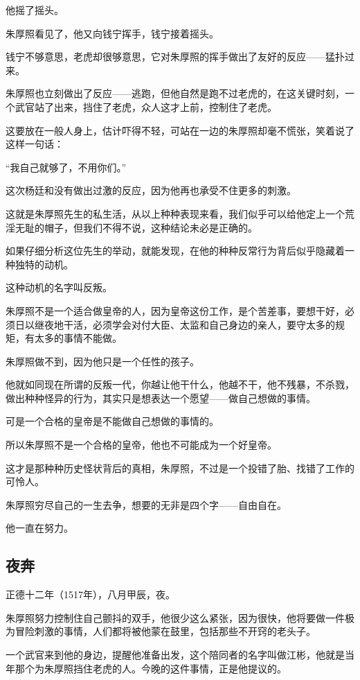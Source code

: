 \begin{multicols}{\theparacolNo}
		他摇了摇头。

		朱厚照看见了，他又向钱宁挥手，钱宁接着摇头。

		钱宁不够意思，老虎却很够意思，它对朱厚照的挥手做出了友好的反应——猛扑过来。

		朱厚照也立刻做出了反应——逃跑，但他自然是跑不过老虎的，在这关键时刻，一个武官站了出来，挡住了老虎，众人这才上前，控制住了老虎。

		这要放在一般人身上，估计吓得不轻，可站在一边的朱厚照却毫不慌张，笑着说了这样一句话：

		“我自己就够了，不用你们。”

		这次杨廷和没有做出过激的反应，因为他再也承受不住更多的刺激。

		这就是朱厚照先生的私生活，从以上种种表现来看，我们似乎可以给他定上一个荒淫无耻的帽子，但我们不得不说，这种结论未必是正确的。

		如果仔细分析这位先生的举动，就能发现，在他的种种反常行为背后似乎隐藏着一种独特的动机。

		这种动机的名字叫反叛。

		朱厚照不是一个适合做皇帝的人，因为皇帝这份工作，是个苦差事，要想干好，必须日以继夜地干活，必须学会对付大臣、太监和自己身边的亲人，要守太多的规矩，有太多的事情不能做。

		朱厚照做不到，因为他只是一个任性的孩子。

		他就如同现在所谓的反叛一代，你越让他干什么，他越不干，他不残暴，不杀戮，做出种种怪异的行为，其实只是想表达一个愿望——做自己想做的事情。

		可是一个合格的皇帝是不能做自己想做的事情的。

		所以朱厚照不是一个合格的皇帝，他也不可能成为一个好皇帝。

		这才是那种种历史怪状背后的真相，朱厚照，不过是一个投错了胎、找错了工作的可怜人。

		朱厚照穷尽自己的一生去争，想要的无非是四个字——自由自在。

		他一直在努力。

		\subsection{夜奔}
		正德十二年（1517年），八月甲辰，夜。

		朱厚照努力控制住自己颤抖的双手，他很少这么紧张，因为很快，他将要做一件极为冒险刺激的事情，人们都将被他蒙在鼓里，包括那些不开窍的老头子。

		一个武官来到他的身边，提醒他准备出发，这个陪同者的名字叫做江彬，他就是当年那个为朱厚照挡住老虎的人。今晚的这件事情，正是他提议的。


\end{multicols}
